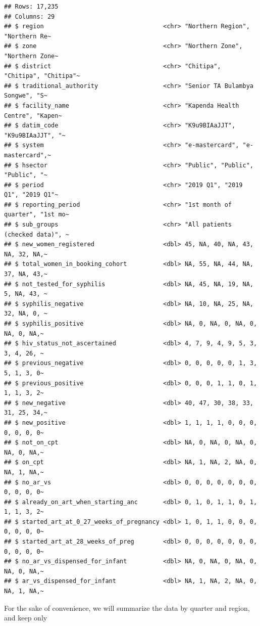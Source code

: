 \documentclass[
]{article}
\begin{document}
\begin{verbatim}
## Rows: 17,235
## Columns: 29
## $ region                                 <chr> "Northern Region", "Northern Re~
## $ zone                                   <chr> "Northern Zone", "Northern Zone~
## $ district                               <chr> "Chitipa", "Chitipa", "Chitipa"~
## $ traditional_authority                  <chr> "Senior TA Bulambya Songwe", "S~
## $ facility_name                          <chr> "Kapenda Health Centre", "Kapen~
## $ datim_code                             <chr> "K9u9BIAaJJT", "K9u9BIAaJJT", "~
## $ system                                 <chr> "e-mastercard", "e-mastercard",~
## $ hsector                                <chr> "Public", "Public", "Public", "~
## $ period                                 <chr> "2019 Q1", "2019 Q1", "2019 Q1"~
## $ reporting_period                       <chr> "1st month of quarter", "1st mo~
## $ sub_groups                             <chr> "All patients (checked data)", ~
## $ new_women_registered                   <dbl> 45, NA, 40, NA, 43, NA, 32, NA,~
## $ total_women_in_booking_cohort          <dbl> NA, 55, NA, 44, NA, 37, NA, 43,~
## $ not_tested_for_syphilis                <dbl> NA, 45, NA, 19, NA, 5, NA, 43, ~
## $ syphilis_negative                      <dbl> NA, 10, NA, 25, NA, 32, NA, 0, ~
## $ syphilis_positive                      <dbl> NA, 0, NA, 0, NA, 0, NA, 0, NA,~
## $ hiv_status_not_ascertained             <dbl> 4, 7, 9, 4, 9, 5, 3, 3, 4, 26, ~
## $ previous_negative                      <dbl> 0, 0, 0, 0, 0, 1, 3, 5, 1, 3, 0~
## $ previous_positive                      <dbl> 0, 0, 0, 1, 1, 0, 1, 1, 1, 3, 2~
## $ new_negative                           <dbl> 40, 47, 30, 38, 33, 31, 25, 34,~
## $ new_positive                           <dbl> 1, 1, 1, 1, 0, 0, 0, 0, 0, 0, 0~
## $ not_on_cpt                             <dbl> NA, 0, NA, 0, NA, 0, NA, 0, NA,~
## $ on_cpt                                 <dbl> NA, 1, NA, 2, NA, 0, NA, 1, NA,~
## $ no_ar_vs                               <dbl> 0, 0, 0, 0, 0, 0, 0, 0, 0, 0, 0~
## $ already_on_art_when_starting_anc       <dbl> 0, 1, 0, 1, 1, 0, 1, 1, 1, 3, 2~
## $ started_art_at_0_27_weeks_of_pregnancy <dbl> 1, 0, 1, 1, 0, 0, 0, 0, 0, 0, 0~
## $ started_art_at_28_weeks_of_preg        <dbl> 0, 0, 0, 0, 0, 0, 0, 0, 0, 0, 0~
## $ no_ar_vs_dispensed_for_infant          <dbl> NA, 0, NA, 0, NA, 0, NA, 0, NA,~
## $ ar_vs_dispensed_for_infant             <dbl> NA, 1, NA, 2, NA, 0, NA, 1, NA,~
\end{verbatim}

For the sake of convenience, we will summarize the data by quarter and
region, and keep only
\end{document}
